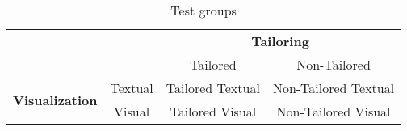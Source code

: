 \begin{table}[H]
\centering
\begin{tabular}{c c | c c}

\multicolumn{2}{c}{} & \multicolumn{2}{c}{\textbf{Tailoring}}\\

\multicolumn{2}{c}{}  & Tailored & Non-Tailored \\
\hline
\multirow{2}{*}{\textbf{Visualization}}    &   Textual &   Tailored Textual  &  Non-Tailored Textual\\
                &   Visual  &   Tailored Visual  &  Non-Tailored Visual\\

\bottomrule
\end{tabular}
\caption{Test groups}
\end{table}